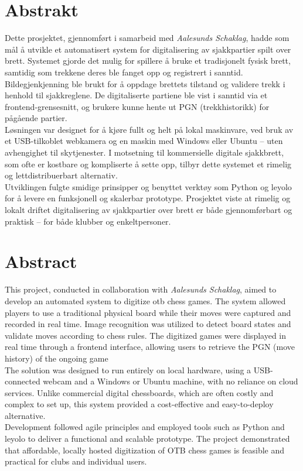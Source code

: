 \chapter*{Abstrakt}

Dette prosjektet, gjennomført i samarbeid med \textit{Aalesunds Schaklag}, hadde som mål å utvikle et automatisert system for digitalisering av sjakkpartier spilt over brett. Systemet gjorde det mulig for spillere å bruke et tradisjonelt fysisk brett, samtidig som trekkene deres ble fanget opp og registrert i sanntid. Bildegjenkjenning ble brukt for å oppdage brettets tilstand og validere trekk i henhold til sjakkreglene. De digitaliserte partiene ble vist i sanntid via et frontend-grensesnitt, og brukere kunne hente ut PGN (trekkhistorikk) for pågående partier. \\

Løsningen var designet for å kjøre fullt og helt på lokal maskinvare, ved bruk av et USB-tilkoblet webkamera og en maskin med Windows eller Ubuntu – uten avhengighet til skytjenester. I motsetning til kommersielle digitale sjakkbrett, som ofte er kostbare og kompliserte å sette opp, tilbyr dette systemet et rimelig og lettdistribuerbart alternativ. \\

Utviklingen fulgte smidige prinsipper og benyttet verktøy som Python og \acrshort{leyolo} for å levere en funksjonell og skalerbar prototype. Prosjektet viste at rimelig og lokalt driftet digitalisering av sjakkpartier over brett er både gjennomførbart og praktisk – for både klubber og enkeltpersoner.

\newpage


\chapter*{Abstract}
This project, conducted in collaboration with \textit{Aalesunds Schaklag}, aimed to develop an automated system to digitize \gls{otb} chess games. The system allowed players to use a traditional physical board while their moves were captured and recorded in real time. Image recognition was utilized to detect board states and validate moves according to chess rules. The digitized games were displayed in real time through a frontend interface, allowing users to retrieve the PGN (move history) of the ongoing game \\

The solution was designed to run entirely on local hardware, using a USB-connected webcam and a Windows or Ubuntu machine, with no reliance on cloud services. Unlike commercial digital chessboards, which are often costly and complex to set up, this system provided a cost-effective and easy-to-deploy alternative. \\

Development followed agile principles and employed tools such as Python and \acrshort{leyolo} to deliver a functional and scalable prototype. The project demonstrated that affordable, locally hosted digitization of OTB chess games is feasible and practical for clubs and individual users.